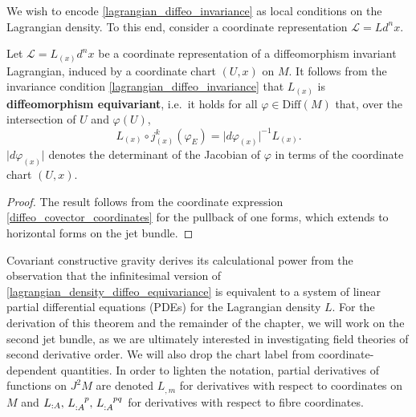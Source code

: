 We wish to encode \eqref{lagrangian_diffeo_invariance} as local conditions on the Lagrangian density. To this end, consider a coordinate representation $\mathscr L = Ld^nx$. 
\begin{proposition}
  Let $\mathscr L = L_{(x)}d^nx$ be a coordinate representation of a diffeomorphism invariant Lagrangian, induced by a coordinate chart $(U,x)$ on $M$. It follows from the invariance condition \eqref{lagrangian_diffeo_invariance} that $L_{(x)}$ is \textbf{diffeomorphism equivariant}, i.e.~it holds for all $\varphi\in\mathrm{Diff}(M)$ that, over the intersection of $U$ and $\varphi(U)$,
  \begin{equation}\label{lagrangian_density_diffeo_equivariance}
    L_{(x)}\circ j^k_{(x)}(\varphi_E) = \lvert d\varphi_{(x)}\rvert^{-1} L_{(x)}.
  \end{equation}
  $\lvert d\varphi_{(x)}\rvert$ denotes the determinant of the Jacobian of $\varphi$ in terms of the coordinate chart $(U,x)$.
\end{proposition}
\begin{proof}
  The result follows from the coordinate expression \eqref{diffeo_covector_coordinates} for the pullback of one forms, which extends to horizontal forms on the jet bundle.
\end{proof}

Covariant constructive gravity derives its calculational power from the observation that the infinitesimal version of \eqref{lagrangian_density_diffeo_equivariance} is equivalent to a system of linear partial differential equations (PDEs) for the Lagrangian density $L$. For the derivation of this theorem and the remainder of the chapter, we will work on the second jet bundle, as we are ultimately interested in investigating field theories of second derivative order. We will also drop the chart label from coordinate-dependent quantities. In order to lighten the notation, partial derivatives of functions on $J^2M$ are denoted $L_{,m}$ for derivatives with respect to coordinates on $M$ and $L_{:A},\,L_{:A}^{\hphantom{:A}p},\,L_{:A}^{\hphantom{:A}pq}$ for derivatives with respect to fibre coordinates.

